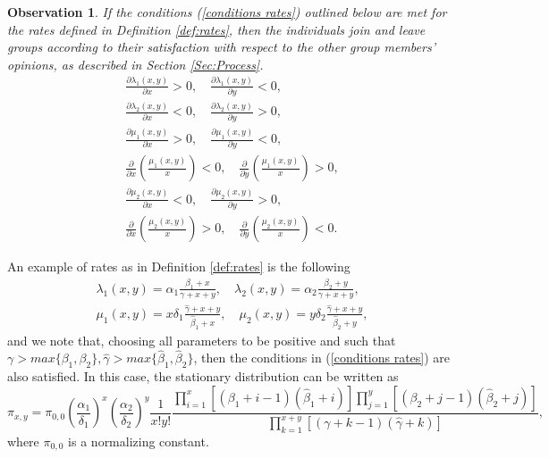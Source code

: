 \documentclass{article}
\newtheorem{observation}{Observation}
\theoremstyle{remark}
\newtheorem*{partial proof}{Partial proof of the Conjecture}
\begin{document}
\begin{observation}
    If the conditions (\ref{conditions rates}) outlined below are met for the rates defined in Definition \ref{def:rates}, then the individuals join and leave groups according to their satisfaction with respect to the other group members' opinions, as described in Section \ref{Sec:Process}.
\begin{equation}
\label{conditions rates}
    \begin{gathered}
        \frac{\partial\lambda_1(x,y)}{\partial x}>0, \quad \frac{\partial\lambda_1(x,y)}{\partial y}<0, \\
        \frac{\partial\lambda_2(x,y)}{\partial x}<0, \quad \frac{\partial\lambda_2(x,y)}{\partial y}>0,\\
        \frac{\partial\mu_1(x,y)}{\partial x}>0, \quad \frac{\partial\mu_1(x,y)}{\partial y}<0, \\
       \frac{\partial}{\partial x} \left( \frac{\mu_1(x,y)}{x} \right)<0, \quad \frac{\partial}{\partial y} \left( \frac{\mu_1(x,y)}{x} \right)>0,  \\
        \frac{\partial\mu_2(x,y)}{\partial x}<0, \quad \frac{\partial\mu_2(x,y)}{\partial y}>0, \\
        \frac{\partial}{\partial x} \left( \frac{\mu_2(x,y)}{x} \right)>0, \quad \frac{\partial}{\partial y} \left( \frac{\mu_2(x,y)}{x} \right)<0.
    \end{gathered}
\end{equation}
\end{observation}

An example of rates as in Definition \ref{def:rates} is the following
\begin{equation*}
\begin{gathered}
\lambda_{1}(x,y) =\alpha_1\frac{\beta_1+x}{\gamma+x+y} , \quad
\lambda_{2}(x,y) =\alpha_2\frac{\beta_2+y}{\gamma+x+y} ,\\
\mu_{1}(x,y) =x \delta_1 \frac{\hat{\gamma}+x+y}{\hat{\beta}_{1}+x}, \quad
\mu_{2}(x,y) =y \delta_2 \frac{\hat{\gamma}+x+y}{\hat{\beta}_{2}+y},
\end{gathered}
\end{equation*}
and we note that, choosing all parameters to be positive and such that $\gamma>max\{\beta_1,\beta_2\}, \hat{\gamma}>max\{\hat{\beta}_1,\hat{\beta}_2\}$, then the conditions in (\ref{conditions rates}) are also satisfied. In this case, the stationary distribution can be written as
\begin{equation*}
\pi_{x,y} = \pi_{0,0} \left(\frac{\alpha_1}{\delta_1}\right)^x \left(\frac{\alpha_2}{\delta_2}\right)^y \frac{1}{x!y!} \frac{\prod_{i=1}^{x} \left[(\beta_1+i-1)(\hat{\beta}_1+i)\right]\prod_{j=1}^{y} \left[(\beta_2+j-1)(\hat{\beta}_2+j)\right]}{\prod_{k=1}^{x+y}\left[ (\gamma+k-1)(\hat{\gamma}+k) \right]},
\label{eq:main_result}
\end{equation*}
where $\pi_{0,0}$ is a normalizing constant.
\end{document}
